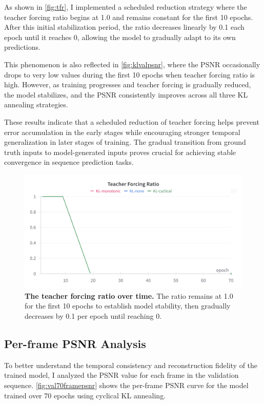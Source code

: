 \documentclass[twocolumn,a4paper]{article}
\begin{document}
As shown in \autoref{fig:tfr}, I implemented a scheduled reduction strategy where the teacher forcing ratio begins at 1.0 and remains constant for the first 10 epochs. After this initial stabilization period, the ratio decreases linearly by 0.1 each epoch until it reaches 0, allowing the model to gradually adapt to its own predictions.

This phenomenon is also reflected in \autoref{fig:klvalpsnr}, where the PSNR occasionally drops to very low values during the first 10 epochs when teacher forcing ratio is high. However, as training progresses and teacher forcing is gradually reduced, the model stabilizes, and the PSNR consistently improves across all three KL annealing strategies.

These results indicate that a scheduled reduction of teacher forcing helps prevent error accumulation in the early stages while encouraging stronger temporal generalization in later stages of training. The gradual transition from ground truth inputs to model-generated inputs proves crucial for achieving stable convergence in sequence prediction tasks.

\begin{figure}[H]
\centering
\includegraphics[width=0.95\linewidth]{figures/tfr}
\caption{\textbf{The teacher forcing ratio over time.} The ratio remains at 1.0 for the first 10 epochs to establish model stability, then gradually decreases by 0.1 per epoch until reaching 0.}
\label{fig:tfr}
\end{figure}



\subsection{Per-frame PSNR Analysis}

To better understand the temporal consistency and reconstruction fidelity of the trained model, I analyzed the PSNR value for each frame in the validation sequence. \autoref{fig:val70framepsnr} shows the per-frame PSNR curve for the model trained over 70 epochs using cyclical KL annealing.
\end{document}
